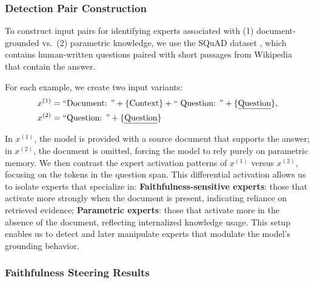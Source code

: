 \documentclass{article} %
\begin{document}
\subsubsection{Detection Pair Construction}

To construct input pairs for identifying experts associated with (1) document-grounded vs.\ (2) parametric knowledge, we use the SQuAD dataset \citep{rajpurkar-etal-2016-squad}, which contains human-written questions paired with short passages from Wikipedia that contain the answer.

For each example, we create two input variants:
\begin{equation}
\begin{aligned}
    x^{(1)} &= \text{``Document: ''} + \{ \text{Context} \} + \text{`` Question: ''} + \{ \text{\underline{Question}} \}, \\
    x^{(2)} &= \text{``Question: ''} + \{ \text{\underline{Question}} \}
\end{aligned}
\end{equation}

In \(x^{(1)}\), the model is provided with a source document that supports the answer; in \(x^{(2)}\), the document is omitted, forcing the model to rely purely on parametric memory.
We then contrast the expert activation patterns of \(x^{(1)}\) versus \(x^{(2)}\), focusing on the tokens in the question span. This differential activation allows us to isolate experts that specialize in:
\textbf{Faithfulness-sensitive experts}: those that activate more strongly when the document is present, indicating reliance on retrieved evidence;
\textbf{Parametric experts}: those that activate more in the absence of the document, reflecting internalized knowledge usage.
This setup enables us to detect and later manipulate experts that modulate the model’s grounding behavior.

% 




\subsubsection{Faithfulness Steering Results}
\end{document}
